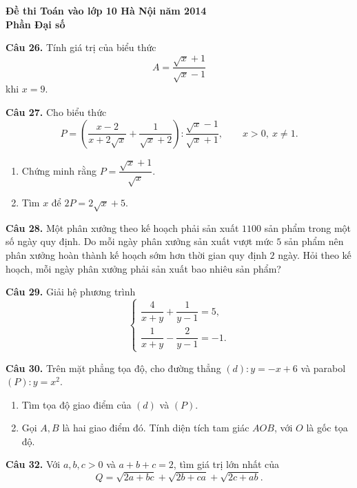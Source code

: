 \documentclass[12pt,a4paper]{article}
\begin{document}
\begin{center}{\Large\bfseries Đề thi Toán vào lớp 10 Hà Nội năm 2014\\Phần Đại số}\end{center}
\textbf{Câu 26.} Tính giá trị của biểu thức
\[
A=\frac{\sqrt{x}+1}{\sqrt{x}-1}
\]
khi $x=9$.

\textbf{Câu 27.} Cho biểu thức
\[
P=\left(\frac{x-2}{x+2\sqrt{x}}+\frac{1}{\sqrt{x}+2}\right):\frac{\sqrt{x}-1}{\sqrt{x}+1},
\qquad x>0,\ x\ne1.
\]
\begin{enumerate}[label=\alph*)]
\item Chứng minh rằng $P=\dfrac{\sqrt{x}+1}{\sqrt{x}}$.
\item Tìm $x$ để $2P=2\sqrt{x}+5$.
\end{enumerate}

\textbf{Câu 28.} Một phân xưởng theo kế hoạch phải sản xuất $1100$ sản phẩm trong một số ngày quy định. Do mỗi ngày phân xưởng sản xuất vượt mức $5$ sản phẩm nên phân xưởng hoàn thành kế hoạch sớm hơn thời gian quy định $2$ ngày. Hỏi theo kế hoạch, mỗi ngày phân xưởng phải sản xuất bao nhiêu sản phẩm?

\textbf{Câu 29.} Giải hệ phương trình
\[
\begin{cases}
\dfrac{4}{x+y}+\dfrac{1}{y-1}=5,\\[3pt]
\dfrac{1}{x+y}-\dfrac{2}{y-1}=-1.
\end{cases}
\]

\textbf{Câu 30.} Trên mặt phẳng tọa độ, cho đường thẳng $(d):y=-x+6$ và parabol $(P):y=x^2$.
\begin{enumerate}[label=\alph*)]
\item Tìm tọa độ giao điểm của $(d)$ và $(P)$.
\item Gọi $A,B$ là hai giao điểm đó. Tính diện tích tam giác $AOB$, với $O$ là gốc tọa độ.
\end{enumerate}

\textbf{Câu 32.} Với $a,b,c>0$ và $a+b+c=2$, tìm giá trị lớn nhất của
\[
Q=\sqrt{2a+bc}+\sqrt{2b+ca}+\sqrt{2c+ab}.
\]
\end{document}
